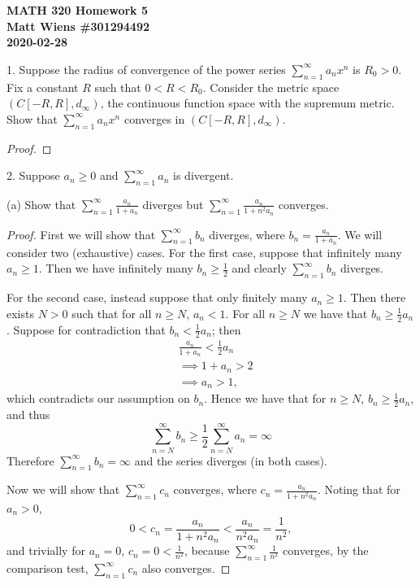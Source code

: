 \documentclass{article}
\begin{document}
\textbf{MATH 320 Homework 5} \\
\textbf{Matt Wiens \#301294492} \\
\textbf{2020-02-28}

1. Suppose the radius of convergence of the power series $\sum_{n =
   1}^\infty a_n x^n$ is $R_0 > 0$. Fix a constant $R$ such that $0 < R
   < R_0$. Consider the metric space $(C[-R, R], d_\infty)$, the
   continuous function space with the supremum metric. Show that
   $\sum_{n = 1}^\infty a_n x^n$ converges in $(C[-R, R], d_\infty)$.

\begin{proof}

\end{proof}

\newpage

2. Suppose $a_n \geq 0$ and $\sum_{n = 1}^\infty a_n$ is divergent.

(a) Show that $\sum_{n = 1}^\infty \frac{a_n}{1 + a_n}$ diverges but
$\sum_{n = 1}^\infty \frac{a_n}{1 + n^2 a_n}$ converges.

\begin{proof}

First we will show that $\sum_{n = 1}^\infty b_n$ diverges, where $b_n =
\frac{a_n}{1 + a_n}$. We will consider two (exhaustive) cases. For the
first case, suppose that infinitely many $a_n \geq 1$. Then we have
infinitely many $b_n \geq \frac{1}{2}$ and clearly $\sum_{n =
1}^\infty b_n$ diverges.

For the second case, instead suppose that only finitely many $a_n \geq
1$. Then there exists $N > 0$ such that for all $n \geq N$, $a_n < 1$.
For all $n \geq N$ we have that $b_n \geq \frac{1}{2} a_n$. Suppose for
contradiction that $b_n < \frac{1}{2} a_n$; then
%
\begin{align*}
    &\frac{a_n}{1 + a_n} < \frac{1}{2} a_n \\
    &\implies 1 + a_n > 2 \\
    &\implies a_n > 1
    ,
\end{align*}
%
which contradicts our assumption on $b_n$. Hence we have that for $n
\geq N$, $b_n \geq \frac{1}{2} a_n$, and thus
%
\begin{equation*}
    \sum_{n = N}^\infty b_n \geq \frac{1}{2} \sum_{n = N}^\infty a_n = \infty
\end{equation*}
%
Therefore $\sum_{n = 1}^\infty b_n = \infty$ and the series diverges (in
both cases).

Now we will show that $\sum_{n = 1}^\infty c_n$ converges, where $c_n
= \frac{a_n}{1 + n^2 a_n}$. Noting that for $a_n > 0$,
%
\begin{equation*}
    0 < c_n = \frac{a_n}{1 + n^2 a_n} < \frac{a_n}{n^2 a_n} = \frac{1}{n^2}
    ,
\end{equation*}
%
and trivially for $a_n = 0$, $c_n = 0 < \frac{1}{n^2}$, because $\sum_{n
= 1}^\infty \frac{1}{n^2}$ converges, by the comparison test, $\sum_{n =
1}^\infty c_n$ also converges.

\end{proof}
\end{document}
